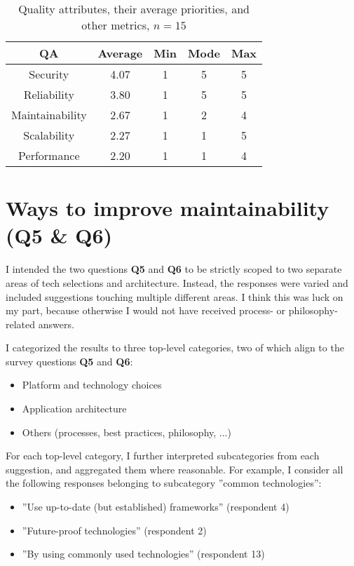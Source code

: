 \documentclass[utf8,english]{gradu3}
\begin{document}
\begin{table}[!h]
  \begin{center}
    \caption{Quality attributes, their average priorities, and other metrics, $n = 15$}
    \label{table:priorities2}
    \begin{tabular}{|c|c|c|c|c|}
      \hline
      \textbf{QA}     & \textbf{Average} & \textbf{Min} & \textbf{Mode} & \textbf{Max} \\
      \hline
      Security        & 4.07             & 1            & 5             & 5            \\
      Reliability     & 3.80             & 1            & 5             & 5            \\
      Maintainability & 2.67             & 1            & 2             & 4            \\
      Scalability     & 2.27             & 1            & 1             & 5            \\
      Performance     & 2.20             & 1            & 1             & 4            \\
      \hline
    \end{tabular}
  \end{center}
\end{table}


\section{Ways to improve maintainability (Q5 \& Q6)}

I intended the two questions \textbf{Q5} and \textbf{Q6} to be strictly scoped to two separate areas of tech selections and architecture.
Instead, the responses were varied and included suggestions touching multiple different areas.
I think this was luck on my part, because otherwise I would not have received process- or philosophy-related answers.

I categorized the results to three top-level categories, two of which align to the survey questions \textbf{Q5} and \textbf{Q6}:
\begin{itemize}
  \item Platform and technology choices
  \item Application architecture
  \item Others (processes, best practices, philosophy, ...)
\end{itemize}

For each top-level category, I further interpreted subcategories from each suggestion, and aggregated them where reasonable.
For example, I consider all the following responses belonging to subcategory ''common technologies'':
\begin{itemize}
  \item ''Use up-to-date (but established) frameworks'' (respondent 4)
  \item ''Future-proof technologies'' (respondent 2)
  \item ''By using commonly used technologies'' (respondent 13)
\end{itemize}
\end{document}

